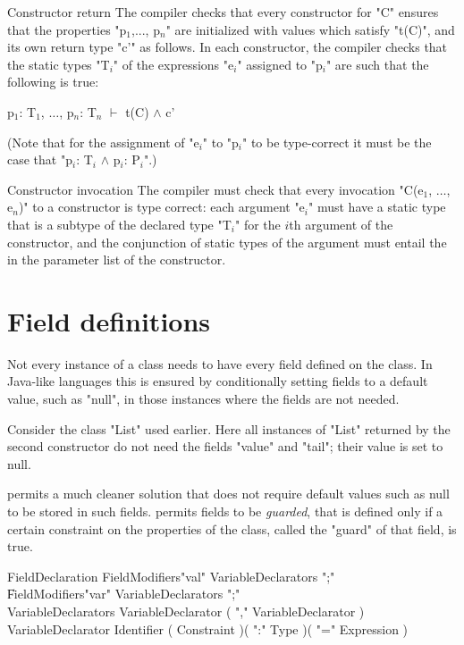 \begin{staticrule}{Constructor return}
   The compiler checks that every constructor for \xcd"C" ensures that
   the properties \xcdmath"p$_1$,..., p$_n$" are initialized with values which satisfy
   \xcdmath"t(C)", and its own return type \xcd"c'" as follows.  In each constructor, the
   compiler checks that the static types \xcdmath"T$_i$" of the expressions \xcdmath"e$_i$"
   assigned to \xcdmath"p$_i$" are such that the following is
   true:
\begin{xtenmath}
p$_1$: T$_1$, $\dots$, p$_n$: T$_n$ $\vdash$ t(C) $\wedge$ c'     
\end{xtenmath}
\end{staticrule}
(Note that for the assignment of \xcdmath"e$_i$" to \xcdmath"p$_i$"
to be type-correct it must be the
    case that \xcdmath"p$_i$: T$_i$ $\wedge$ p$_i$: P$_i$".) 


\begin{staticrule}{Constructor invocation}
The compiler must check that every invocation \xcdmath"C(e$_1$, $\dots$, e$_n$)" to a
constructor is type correct: each argument \xcdmath"e$_i$" must have a static type
that is a subtype of the declared type \xcdmath"T$_i$" for the $i$th
argument of the
constructor, and the conjunction of static types of the argument must
entail the  in the parameter list of the constructor.
\end{staticrule}

\section{Field definitions}

Not every instance of a class needs to have every field defined on the
class. In Java-like languages this is ensured by conditionally setting
fields to a default value, such as \xcd"null", in those instances where the
fields are not needed.  

Consider the class \xcd"List" used earlier.  Here all instances of \xcd"List"
returned by the second constructor do not need the fields \xcd"value" and
\xcd"tail"; their value is set to null.

\Xten{} permits a much cleaner solution that does not require default
values such as null to be stored in such fields. \Xten{} permits fields to
be {\em guarded}, that is defined only if a certain constraint on the
properties of the class, called the \xcd"guard" of that field, is true.

\begin{grammar}
FieldDeclaration  \:
   FieldModifiers\opt \xcd"val" VariableDeclarators \xcd";" \\
   \|
   FieldModifiers\opt \xcd"var" VariableDeclarators \xcd";" \\
VariableDeclarators \:
        VariableDeclarator ( \xcd"," VariableDeclarator )\star \\
VariableDeclarator \:
   Identifier ( Constraint )\opt ( \xcd":" Type )\opt ( \xcd"=" Expression )\opt \\
\end{grammar}

